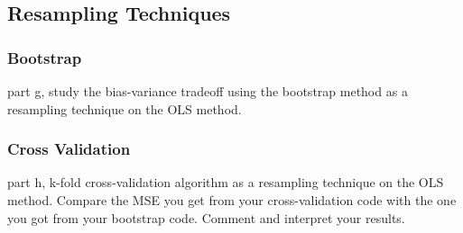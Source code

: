 \documentclass[amssymb,twocolumn,aps]{revtex4}
\begin{document}
\subsection{Resampling Techniques}

\subsubsection{Bootstrap}
part g, study the bias-variance tradeoff using the bootstrap method as a resampling technique on the OLS method.

\subsubsection{Cross Validation}
part h, k-fold cross-validation algorithm as a resampling technique on the OLS method. Compare the MSE you get from your cross-validation code with the one you got from your bootstrap code.
Comment and interpret your results.
\end{document}
